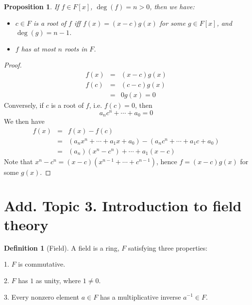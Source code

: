 \documentclass{article}
\theoremstyle{MyNonumberplain}
\theoremstyle{break}
\newtheorem*{proof}{Proof. }
\theoremstyle{break}
\newtheorem{proposition}{Proposition}[section]
\theoremstyle{break}
\theoremstyle{definition}
\theoremstyle{break}
\newtheorem{definition}{Definition}[section]
\begin{document}
\begin{thmbox}
    \begin{proposition}
        If $f \in F [x]$, $\deg (f) = n > 0$, then we have:\bigskip
        \begin{itemize}
          \item $c \in F$ is a root of $f$ iff $f (x) = (x - c) g (x)$ for some $g \in
          F [x]$, and $\deg (g) = n - 1$.\bigskip
          
          \item $f$ has at most $n$ roots in $F$. 
        \end{itemize}
    \end{proposition}
    \begin{prfbox}
        \begin{proof}
            \begin{eqnarray*}
                f (x) & = & (x - c) g (x)\\
                f (c) & = & (c - c) g (x)\\
                & = & 0 g (x) = 0
              \end{eqnarray*}
              Conversely, if $c$ is a root of $f$, i.e. $f (c) = 0$, then
              \[ a_n c^n + \cdots + a_0 = 0 \]
              We then have
              \begin{eqnarray*}
                f (x) & = & f (x) - f (c)\\
                & = & (a_n x^n + \cdots + a_1 x + a_0) - (a_n c^n + \cdots + a_1 c + a_0)\\
                & = & (a_n) (x^n - c^n) + \cdots + a_1 (x - c)
              \end{eqnarray*}
              Note that $x^n - c^n = (x - c) (x^{n - 1} + \cdots + c^{n - 1})$, hence $f =
              (x - c) g (x)$ for some $g (x)$.
        \end{proof}
    \end{prfbox}
\end{thmbox}

\newpage

\section{Add. Topic 3. Introduction to field theory}

\begin{defbox}
    \begin{definition}[Field]
        A field is a ring, $F$ satisfying three properties:\bigskip
    
        1. $F$ is commutative.\bigskip
        
        2. $F$ has $1$ as unity, where $1 \neq 0$.\bigskip
        
        3. Every nonzero element $a \in F$ has a multiplicative inverse $a^{- 1} \in
        F$. 
    \end{definition}
\end{defbox}
\end{document}
